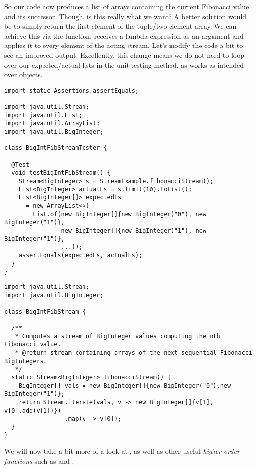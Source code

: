 So our code now produces a list of  arrays containing the current Fibonacci value and its successor. Though, is this really what we want? A better solution would be to simply return the first element of the tuple/two-element array. We can achieve this via the  function.  receives a lambda expression as an argument and applies it to every element of the acting stream. Let's modify the code a bit to see an improved output. Excellently, this change means we do not need to loop over our expected/actual lists in the unit testing method, as  works as intended over  objects.

\begin{cl}[]{}
\begin{lstlisting}[language=MyJava]
import static Assertions.assertEquals;

import java.util.Stream;
import java.util.List;
import java.util.ArrayList;
import java.util.BigInteger;

class BigIntFibStreamTester {

  @Test
  void testBigIntFibStream() {
    Stream<BigInteger> s = StreamExample.fibonacciStream();
    List<BigInteger> actualLs = s.limit(10).toList();
    List<BigInteger[]> expectedLs 
      = new ArrayList<>(
        List.of(new BigInteger[]{new BigInteger("0"), new BigInteger("1")},
                new BigInteger[]{new BigInteger("1"), new BigInteger("1")},
                ...));
    assertEquals(expectedLs, actualLs);
  }
}
\end{lstlisting}
\end{cl}

\begin{cl}[]{}
\begin{lstlisting}[language=MyJava]
import java.util.Stream;
import java.util.BigInteger;

class BigIntFibStream {

  /**
   * Computes a stream of BigInteger values computing the nth Fibonacci value.
   * @return stream containing arrays of the next sequential Fibonacci BigIntegers.
   */
  static Stream<BigInteger> fibonacciStream() {
    BigInteger[] vals = new BigInteger[]{new BigInteger("0"),new BigInteger("1")};
    return Stream.iterate(vals, v -> new BigInteger[]{v[1], v[0].add(v[1])})
                 .map(v -> v[0]);
  }
}
\end{lstlisting}
\end{cl}

We will now take a bit more of a look at , as well as other useful \textit{higher-order functions} such as  and .


